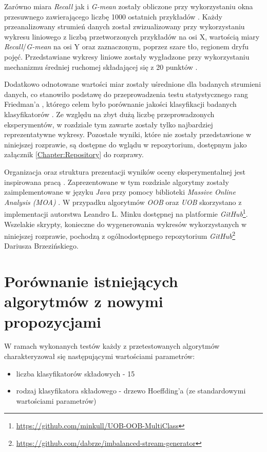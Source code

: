 Zarówno miara \textit{Recall} jak i \textit{G-mean} zostały obliczone przy wykorzystaniu okna przesuwnego zawierającego liczbę 1000 ostatnich przykładów \cite{Article:Evaluation}. Każdy przeanalizowany strumień danych został zwizualizowany przy wykorzystaniu wykresu liniowego z liczbą przetworzonych przykładów na osi X, wartością miary \textit{Recall}/\textit{G-mean} na osi Y oraz zaznaczonym, poprzez szare tło, regionem dryfu pojęć. Przedstawiane wykresy liniowe zostały wygładzone przy wykorzystaniu mechanizmu średniej ruchomej składającej się z 20 punktów \cite{Article:TypyPrzykladow}.

Dodatkowo odnotowane wartości miar zostały uśrednione dla badanych strumieni danych, co stanowiło podstawę do przeprowadzenia testu statystycznego rang Friedman'a \cite{Article:Friedman}, którego celem było porównanie jakości klasyfikacji badanych klasyfikatorów \cite{Article:TypyPrzykladow}. Ze względu na zbyt dużą liczbę przeprowadzonych eksperymentów, w rozdziale tym zawarte zostały tylko najbardziej reprezentatywne wykresy. Pozostałe wyniki, które nie zostały przedstawione w niniejszej rozprawie, są dostępne do wglądu w repozytorium, dostępnym jako załącznik \ref{Chapter:Repository} do rozprawy.

Organizacja oraz struktura prezentacji wyników oceny eksperymentalnej jest inspirowana pracą \cite{Article:TypyPrzykladow}. Zaprezentowane w tym rozdziale algorytmy zostały zaimplementowane w języku \textit{Java} przy pomocy biblioteki \textit{Massive Online Analysis (MOA)} \cite{Article:MOA}. W przypadku algorytmów \textit{OOB} oraz \textit{UOB} skorzystano z implementacji autorstwa Leandro L. Minku dostępnej na platformie \textit{GitHub}\footnote{\url{https://github.com/minkull/UOB-OOB-MultiClass}}. Wszelakie skrypty, konieczne do wygenerowania wykresów wykorzystanych w niniejszej rozprawie, pochodzą z ogólnodostępnego repozytorium \textit{GitHub}\footnote{\url{https://github.com/dabrze/imbalanced-stream-generator}} Dariusza Brzezińskiego.

\section{Porównanie istniejących algorytmów z nowymi propozycjami}
\label{Section:AlgorithmsComparison}

\noindent W ramach wykonanych testów każdy z przetestowanych algorytmów charakteryzował się następującymi wartościami parametrów:

\begin{itemize}
    \item liczba klasyfikatorów składowych - 15
    \item rodzaj klasyfikatora składowego - drzewo Hoeffding'a (ze standardowymi wartościami parametrów)
\end{itemize}

